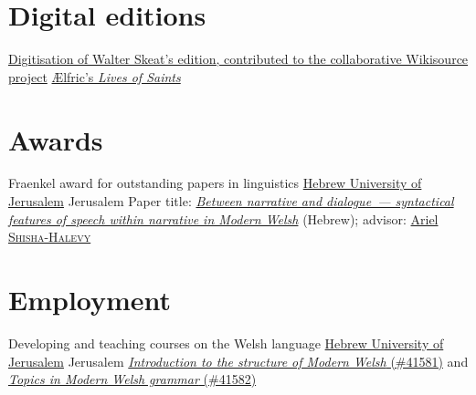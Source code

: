 \section{Digital editions}

	{\href{https://en.wikisource.org/wiki/\%C3\%86lfric's_Lives_of_Saints}{Digitisation of Walter Skeat’s edition, contributed to the collaborative Wikisource project}}
	{\href{https://en.wikisource.org/wiki/\%C3\%86lfric's_Lives_of_Saints}{Ælfric's \emph{Lives of Saints}}}
	{}
	{}
	{}



\section{Awards}

	{Fraenkel award for outstanding papers in linguistics} %
	{\href{https://huji.ac.il}{Hebrew University of Jerusalem}}
	{Jerusalem}
	{}
	{Paper title: \href{https://ac.digitalwords.net/\#seminarpapers-2008}{\emph{Between narrative and dialogue~— syntactical features of speech within narrative in Modern Welsh}} (Hebrew); advisor: \href{https://arielshishahalevy.huji.ac.il/}{Ariel \textsc{Shisha-Halevy}}}






\section{Employment}%
\label{sec:employment}

	{Developing and teaching courses on the Welsh language}
	{\href{https://huji.ac.il}{Hebrew University of Jerusalem}}
	{Jerusalem}
	{}
	{\href{https://ac.digitalwords.net/\#courses-2019-10-27}{\emph{Introduction to the structure of Modern Welsh} (\#41581)} and \href{https://ac.digitalwords.net/\#courses-2020-10-22}{\emph{Topics in Modern Welsh grammar} (\#41582)}}

